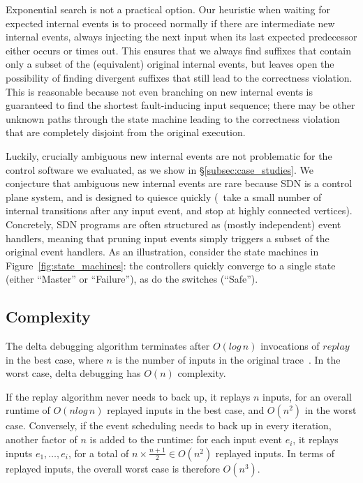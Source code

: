 Exponential search is not a practical option. Our heuristic when waiting for expected internal
events is to proceed normally if there are intermediate new internal events,
always injecting the next input when its last expected predecessor
either occurs or times out. This ensures that we always find suffixes that
contain only a subset of the (equivalent) original internal events, but leaves open the
possibility of finding divergent suffixes that still lead to the correctness
violation. This is reasonable because not even branching on new
internal events is guaranteed to find the shortest fault-inducing input
sequence;
there may be other unknown
paths through the state machine leading to the correctness violation that are
completely disjoint from the original execution.

Luckily, crucially ambiguous new internal events are not problematic for the
control software we evaluated, as we show in \S\ref{subsec:case_studies}.
We conjecture that ambiguous new internal events are
rare because SDN is a control plane system,
and is designed to quiesce quickly (\ie~take a small number of internal
transitions after any input event, and stop at highly connected vertices).
Concretely, SDN programs are often structured as (mostly independent) event
handlers, meaning that pruning input events simply triggers a subset of the original
event handlers. As an illustration, consider the state machines
in Figure~\ref{fig:state_machines}:
the controllers quickly converge to a single state (either ``Master'' or
``Failure''), as do the switches (``Safe'').

\subsection{Complexity}
\label{subsec:complexity}

The delta debugging algorithm terminates after
$O(log\,n)$
invocations of $replay$ in the best case, where $n$ is the number of inputs in the original
trace~\cite{Zeller:1999:YMP:318773.318946}. In the worst case, delta debugging
has $O(n)$ complexity.

If the replay algorithm
never needs to back up, it replays $n$ inputs,
for an overall runtime of $O(nlog\,n)$ replayed inputs in the best case, and $O(n^2)$ in the worst case.
Conversely, if the event scheduling
needs to back up in every iteration, another factor of $n$ is added to the
runtime: for each input event
$e_i$, it replays inputs $e_1,\dots,e_i$, for a total of
$n \times \frac{n+1}{2} \in O(n^2)$ replayed inputs. In terms of replayed
inputs, the
overall worst case is therefore $O(n^3)$.

